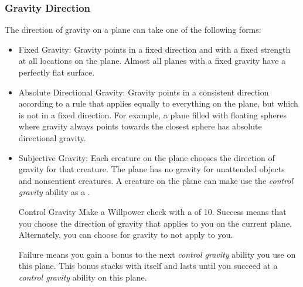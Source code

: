         \subsubsection{Gravity Direction}
            The direction of gravity on a plane can take one of the following forms:
            \begin{itemize}
                \item Fixed Gravity: Gravity points in a fixed direction and with a fixed strength at all locations on the plane.
                    Almost all planes with a fixed gravity have a perfectly flat surface.
                \item Absolute Directional Gravity: Gravity points in a consistent direction according to a rule that applies equally to everything on the plane, but which is not in a fixed direction.
                    For example, a plane filled with floating spheres where gravity always points towards the closest sphere has absolute directional gravity.
                \item Subjective Gravity: Each creature on the plane chooses the direction of gravity for that creature.
                    The plane has no gravity for unattended objects and nonsentient creatures.
                    A creature on the plane can make use the \textit{control gravity} ability as a .
                    \begin{freeability}{Control Gravity}
                        Make a Willpower check with a  of 10.
                        Success means that you choose the direction of gravity that applies to you on the current plane.
                        Alternately, you can choose for gravity to not apply to you.

                        Failure means you gain a  bonus to the next \textit{control gravity} ability you use on this plane.
                        This bonus stacks with itself and lasts until you succeed at a \textit{control gravity} ability on this plane.
                    \end{freeability}
            \end{itemize}

